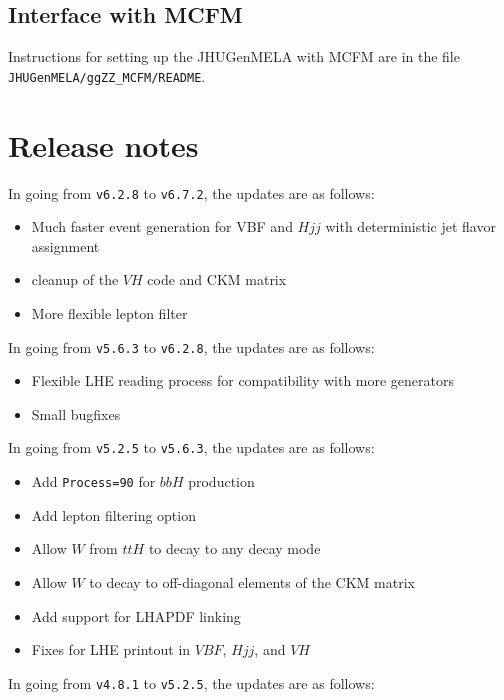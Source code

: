 \documentclass[aps,superscriptaddress,nofootinbib]{revtex4}
\begin{document}
\subsection{Interface with MCFM}

Instructions for setting up the JHUGenMELA with MCFM are in the file \verb|JHUGenMELA/ggZZ_MCFM/README|.


\section{ Release notes }

\noindent
In going from \verb|v6.2.8| to \verb|v6.7.2|, the updates are as follows:

\begin{itemize}
\item Much faster event generation for VBF and $Hjj$ with deterministic jet flavor assignment
\item cleanup of the $VH$ code and CKM matrix
\item More flexible lepton filter
\end{itemize}

\noindent
In going from \verb|v5.6.3| to \verb|v6.2.8|, the updates are as follows:

\begin{itemize}
\item Flexible LHE reading process for compatibility with more generators
\item Small bugfixes
\end{itemize}

\noindent
In going from \verb|v5.2.5| to \verb|v5.6.3|, the updates are as follows:

\begin{itemize}
\item Add \verb|Process=90| for $bbH$ production
\item Add lepton filtering option
\item Allow $W$ from $ttH$ to decay to any decay mode
\item Allow $W$ to decay to off-diagonal elements of the CKM matrix
\item Add support for LHAPDF linking
\item Fixes for LHE printout in $VBF$, $Hjj$, and $VH$
\end{itemize}

\noindent
In going from \verb|v4.8.1| to \verb|v5.2.5|, the updates are as follows:
\end{document}
